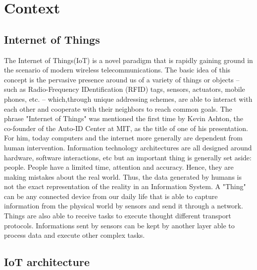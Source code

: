 \documentclass[11pt]{article}
\begin{document}
\newpage

\section{Context} \label{context}

\subsection{Internet of Things}

The Internet of Things(IoT) is a novel paradigm that is rapidly gaining ground in the scenario of modern wireless telecommunications. The basic idea of this concept is the pervasive presence around us of a variety of things or objects – such as Radio-Frequency IDentification (RFID) tags, sensors, actuators, mobile phones, etc. – which,through unique addressing schemes, are able to interact with each other and cooperate with their neighbors to reach common goals. \cite{2}
\newline
\newline
The phrase "Internet of Things" was mentioned the first time by Kevin Ashton, the co-founder of the Auto-ID Center at MIT, as the title of one of his presentation. For him, today computers and the internet more generally are dependent from human intervention. Information technology architectures are all designed around hardware, software interactions, etc but an important thing is generally set aside: people. People have a limited time, attention and accuracy. Hence, they are making mistakes about the real world. Thus, the data generated by humans is not the exact representation of the reality in an Information System.
\newline
\newline
A "Thing" can be any connected device from our daily life that is able to capture information from the physical world by sensors and send it through a network. Things are also able to receive tasks to execute thought different transport protocols. Informations sent by sensors can be kept by another layer able to process data and execute other complex tasks. 

\subsection{IoT architecture}
\end{document}
